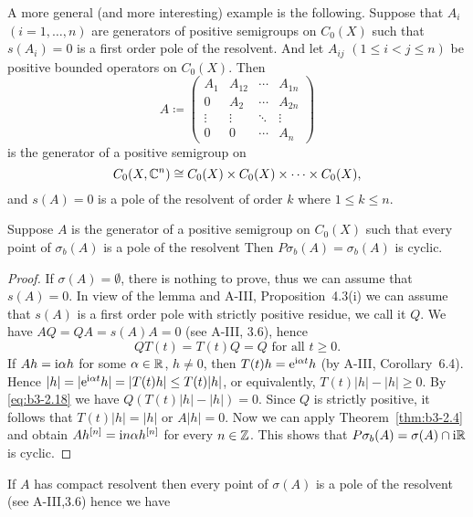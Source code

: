 A more general (and more interesting) example is the following.
Suppose that $A_{i}$ $(i = 1,\ldots,n)$ are generators of positive semigroups on $C_{0}(X)$ such that $s(A_{i}) = 0$ is a first order pole of the resolvent.
And let $A_{ij}$ $(1 \leq i < j \leq n)$ be positive bounded operators on $C_{0}(X)$.
Then
\[
A \coloneqq \begin{pmatrix}
	A_{1} & A_{12} & \cdots & A_{1n} \\
	0 & A_{2} & \cdots & A_{2n} \\
	\vdots & \vdots & \ddots & \vdots \\
	0 & 0 & \cdots & A_{n}
\end{pmatrix}
\]
is the generator of a positive semigroup on 
%
\[
	C_{0}(X,\mathbb{C}^{n}) \cong C_{0}(X) \times C_{0}(X) \times \cdots \times C_{0}(X) , 
\]
%
and $s(A) = 0$ is a pole of the resolvent of order $k$ where $1 \leq k \leq n$.
\begin{theorem}\label{thm:b3-2.9}
Suppose $A$ is the generator of a positive semigroup on $C_{0}(X)$ such that every point of $\sigma_{b}(A)$ is a pole of the resolvent
Then $P\sigma_{b}(A) = \sigma_{b}(A)$ is cyclic.
\end{theorem}
\begin{proof}
	If $\sigma(A) = \emptyset$, there is nothing to prove, thus we can assume that $s(A) = 0$.
	In view of the lemma and A-III, Proposition~4.3(i) we can assume that $s(A)$ is a first order pole with strictly positive residue, we call it $Q$.
	We have $AQ = QA = s(A)A = 0$ (see A-III, 3.6), hence
	\begin{equation}\label{eq:b3-2.18}
		QT(t) = T(t)Q = Q \text{ for all } t \geq 0.
	\end{equation}
	If $Ah = \mathrm{i}\alpha h$ for some $\alpha \in \mathbb{R}$, $h \neq 0$, then $T(t)h = \mathrm{e}^{\mathrm{i}\alpha t}h$ (by A-III, Corollary~6.4).
	Hence $|h| = |\mathrm{e}^{\mathrm{i}\alpha t}h| = |T(t)h| \leq T(t)|h|$, or equivalently, $T(t)|h| - |h| \geq 0$.
	By \eqref{eq:b3-2.18} we have $Q(T(t)|h| - |h|) = 0$.
	Since $Q$ is strictly positive, it follows that $T(t)|h| = |h|$ or $A|h| = 0$.
	Now we can apply Theorem~\ref{thm:b3-2.4} and obtain $Ah^{[n]} = \mathrm{i} n\alpha h^{[n]}$ for every $n \in \mathbb{Z}$.
	This shows that $P\sigma_{b}(A) = \sigma(A) \cap \mathrm{i}\mathbb{R}$ is cyclic.
\end{proof}
If $A$ has compact resolvent then every point of $\sigma(A)$ is a pole of the resolvent (see A-III,3.6) hence we have
